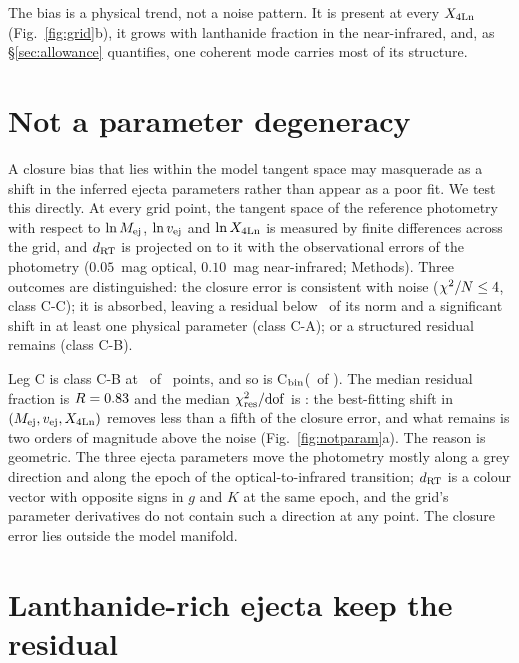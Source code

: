 \documentclass[11pt]{article}
\newcommand{\Cboth}{C\xspace}
\newcommand{\Cbin}{C$_{\rm bin}$\xspace}
\newcommand{\dRT}{d_{\rm RT}}
\newcommand{\Xlan}{X_{\rm 4Ln}}
\newcommand{\Mej}{M_{\rm ej}}
\newcommand{\vej}{v_{\rm ej}}
\newcommand{\chires}{\chi^2_{\rm res}/{\rm dof}}
\begin{document}
The bias is a physical trend, not a noise pattern. It is present at every $\Xlan$ (Fig.~\ref{fig:grid}b), it grows with lanthanide fraction in the near-infrared, and, as \S\ref{sec:allowance} quantifies, one coherent mode carries most of its structure.

\section{Not a parameter degeneracy}\label{sec:notdegeneracy}

A closure bias that lies within the model tangent space may masquerade as a shift in the inferred ejecta parameters rather than appear as a poor fit. We test this directly. At every grid point, the tangent space of the reference photometry with respect to $\ln\Mej$, $\ln\vej$ and $\ln\Xlan$ is measured by finite differences across the grid, and $\dRT$ is projected on to it with the observational errors of the photometry ($0.05$~mag optical, $0.10$~mag near-infrared; Methods). Three outcomes are distinguished: the closure error is consistent with noise ($\chi^2/N\le4$, class C-C); it is absorbed, leaving a residual below \ThrR\ of its norm and a significant shift in at least one physical parameter (class C-A); or a structured residual remains (class C-B).  %

Leg \Cboth is class C-B at \GateTwoCB\ of \nPoints\ points, and so is \Cbin (\GateTwoBinnedCB\ of \nPoints). The median residual fraction is $R=0.83$ and the median $\chires$ is \GateTwoMedianChi: the best-fitting shift in $(\Mej,\vej,\Xlan)$ removes less than a fifth of the closure error, and what remains is two orders of magnitude above the noise (Fig.~\ref{fig:notparam}a). The reason is geometric. The three ejecta parameters move the photometry mostly along a grey direction and along the epoch of the optical-to-infrared transition; $\dRT$ is a colour vector with opposite signs in $g$ and $K$ at the same epoch, and the grid's parameter derivatives do not contain such a direction at any point. The closure error lies outside the model manifold.

\section{Lanthanide-rich ejecta keep the residual}\label{sec:nuisance}
\end{document}
